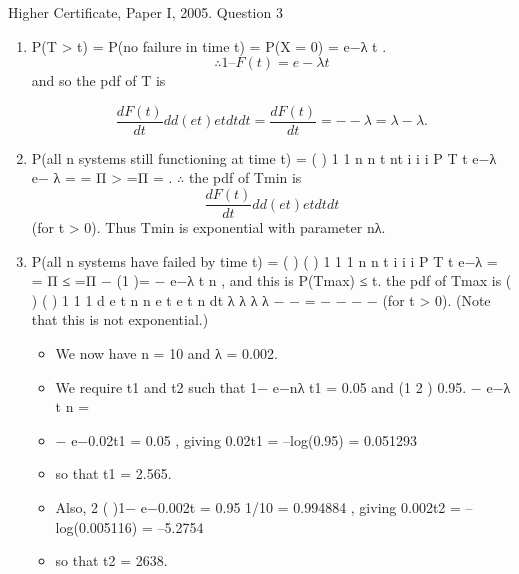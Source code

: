 \documentclass[a4paper,12pt]{article}
\begin{document}
Higher Certificate, Paper I, 2005. Question 3
\begin{enumerate}
\item P(T > t) = P(no failure in time t) = P(X = 0) = e−λ t .
\[\therefore 1 – F(t) = e−λ t \] and so the pdf of T is 

\[ \frac{dF (t )}{dt}d  d (e t ) e t
dt dt
= \frac{dF (t )}{dt} = − −λ =λ −λ .\]

\item P(all n systems still functioning at time t) = ( )
1 1
n n
t nt
i
i i
P T t e−λ e− λ
= =
Π > =Π = .
$\therefore$ the pdf of Tmin is
\[ \frac{dF (t )}{dt}d  d (e t ) e t
dt dt\] (for t > 0).
Thus Tmin is exponential with parameter nλ.
\item  P(all n systems have failed by time t) = ( ) ( )
1 1
1
n n
t
i
i i
P T t e−λ
= =
Π ≤ =Π −
(1 )= − e−λ t n , and this is P(Tmax) ≤ t.
\therefore the pdf of Tmax is {( ) } ( ) 1 1 1 d e t n n e t e t n
dt
λ λ λ λ − − = − − − − (for t > 0).
(Note that this is not exponential.)


\begin{itemize}
\item We now have n = 10 and λ = 0.002. 
\item We require t1 and t2 such that 1− e−nλ t1 = 0.05
and (1 2 ) 0.95. − e−λ t n =
\item {}− e−0.02t1 = 0.05 , giving 0.02t1 = –log(0.95) = 0.051293 
\item so that t1 = 2.565.
\item Also, 2 ( )1− e−0.002t = 0.95 1/10 = 0.994884 , giving 0.002t2 = –log(0.005116) = –5.2754
\item so that t2 = 2638.
\end{itemize}

\end{enumerate}
\end{document}
